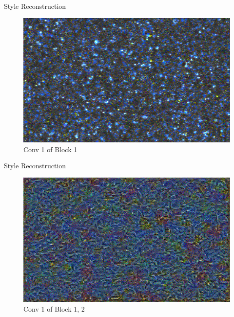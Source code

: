 \documentclass{beamer}
\begin{document}
\begin{frame}{Style Reconstruction}
\begin{figure}[ht]
\centering
\caption{Conv 1 of Block 1}
\includegraphics[width=\textwidth]{img/style/block1_conv1.png}
\end{figure}
\end{frame}

\begin{frame}{Style Reconstruction}
\begin{figure}[ht]
\centering
\caption{Conv 1 of Block 1, 2}
\includegraphics[width=\textwidth]{img/style/block2_conv1.png}
\end{figure}
\end{frame}
\end{document}

